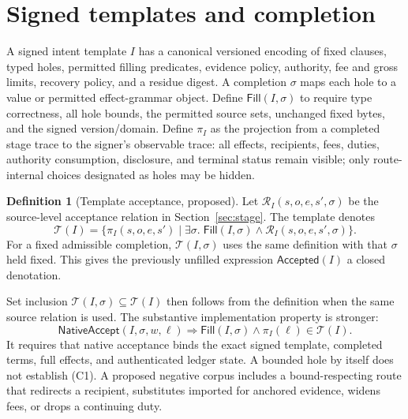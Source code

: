 \documentclass[11pt,a4paper]{article}
\newcommand{\Rel}{\mathcal{R}}
\newcommand{\Tr}{\mathcal{T}}
\theoremstyle{definition}
\newtheorem{definition}{Definition}
\begin{document}
\section{Signed templates and completion}
A signed intent template $I$ has a canonical versioned encoding of fixed clauses, typed holes, permitted filling predicates, evidence policy, authority, fee and gross limits, recovery policy, and a residue digest. A completion $\sigma$ maps each hole to a value or permitted effect-grammar object. Define $\mathsf{Fill}(I,\sigma)$ to require type correctness, all hole bounds, the permitted source sets, unchanged fixed bytes, and the signed version/domain. Define $\pi_I$ as the projection from a completed stage trace to the signer's observable trace: all effects, recipients, fees, duties, authority consumption, disclosure, and terminal status remain visible; only route-internal choices designated as holes may be hidden.

\begin{definition}[Template acceptance, proposed]
Let $\Rel_I(s,o,e,s',\sigma)$ be the source-level acceptance relation in Section~\ref{sec:stage}. The template denotes
\[
\Tr(I)=\bigl\{\pi_I(s,o,e,s')\mid
  \exists\sigma.\;\mathsf{Fill}(I,\sigma)\land\Rel_I(s,o,e,s',\sigma)\bigr\}.
\]
For a fixed admissible completion, $\Tr(I,\sigma)$ uses the same definition with that $\sigma$ held fixed. This gives the previously unfilled expression $\mathsf{Accepted}(I)$ a closed denotation.
\end{definition}

Set inclusion $\Tr(I,\sigma)\subseteq\Tr(I)$ then follows from the definition when the same source relation is used. The substantive implementation property is stronger:
\[
\mathsf{NativeAccept}(I,\sigma,w,\ell)
\Longrightarrow
\mathsf{Fill}(I,\sigma)\land\pi_I(\ell)\in\Tr(I).
\tag{C1}
\]
It requires that native acceptance binds the exact signed template, completed terms, full effects, and authenticated ledger state. A bounded hole by itself does not establish (C1). A proposed negative corpus includes a bound-respecting route that redirects a recipient, substitutes imported for anchored evidence, widens fees, or drops a continuing duty.
\end{document}

